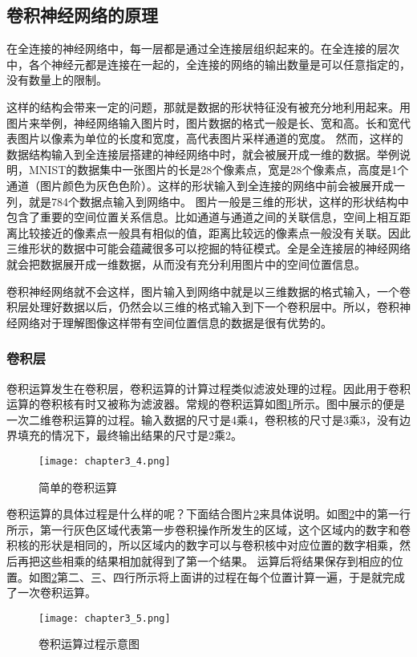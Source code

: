 \subsection{卷积神经网络的原理}
在全连接的神经网络中，每一层都是通过全连接层组织起来的。在全连接的层次中，各个神经元都是连接在一起的，全连接的网络的输出数量是可以任意指定的，没有数量上的限制。

这样的结构会带来一定的问题，那就是数据的形状特征没有被充分地利用起来。用图片来举例，神经网络输入图片时，图片数据的格式一般是长、宽和高。长和宽代表图片以像素为单位的长度和宽度，高代表图片采样通道的宽度。
然而，这样的数据结构输入到全连接层搭建的神经网络中时，就会被展开成一维的数据。举例说明，MNIST的数据集中一张图片的长是28个像素点，宽是28个像素点，高度是1个通道（图片颜色为灰色色阶）。这样的形状输入到全连接的网络中前会被展开成一列，就是784个数据点输入到网络中。
图片一般是三维的形状，这样的形状结构中包含了重要的空间位置关系信息。比如通道与通道之间的关联信息，空间上相互距离比较接近的像素点一般具有相似的值，距离比较远的像素点一般没有关联。因此三维形状的数据中可能会蕴藏很多可以挖掘的特征模式。全是全连接层的神经网络就会把数据展开成一维数据，从而没有充分利用图片中的空间位置信息。

卷积神经网络就不会这样，图片输入到网络中就是以三维数据的格式输入，一个卷积层处理好数据以后，仍然会以三维的格式输入到下一个卷积层中。所以，卷积神经网络对于理解图像这样带有空间位置信息的数据是很有优势的。

\subsubsection{卷积层}
卷积运算发生在卷积层，卷积运算的计算过程类似滤波处理的过程。因此用于卷积运算的卷积核有时又被称为滤波器。常规的卷积运算如图\ref{fig:chapter3_4}所示。图中展示的便是一次二维卷积运算的过程。输入数据的尺寸是4乘4，卷积核的尺寸是3乘3，没有边界填充的情况下，最终输出结果的尺寸是2乘2。
\begin{figure}
    \centering
    \texttt{[image: chapter3\_4.png]}
    \caption{简单的卷积运算\cite{luyujie_216}}
    \label{fig:chapter3_4}
\end{figure}

卷积运算的具体过程是什么样的呢？下面结合图片\ref{fig:chapter3_5}来具体说明。如图\ref{fig:chapter3_5}中的第一行所示，第一行灰色区域代表第一步卷积操作所发生的区域，这个区域内的数字和卷积核的形状是相同的，所以区域内的数字可以与卷积核中对应位置的数字相乘，然后再把这些相乘的结果相加就得到了第一个结果。
运算后将结果保存到相应的位置。如图\ref{fig:chapter3_5}第二、三、四行所示将上面讲的过程在每个位置计算一遍，于是就完成了一次卷积运算。
\begin{figure}
    \centering
    \texttt{[image: chapter3\_5.png]}
    \caption{卷积运算过程示意图\cite{luyujie_216}}
    \label{fig:chapter3_5}
\end{figure}

